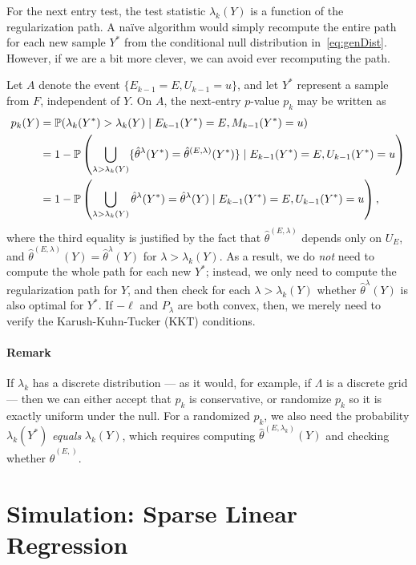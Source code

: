 \documentclass{article}
\begin{document}
For the next entry test, the test statistic $\lambda_k(Y)$ is a function of the regularization path. A na\"{i}ve algorithm would simply recompute the entire path for each new sample $Y^*$ from the conditional null distribution in~\eqref{eq:genDist}. However, if we are a bit more clever, we can avoid ever recomputing the path.

Let $A$ denote the event $\{E_{k-1}=E, U_{k-1}=u\}$, and let $Y^*$ represent a sample from $F$, independent of $Y$. On $A$, the next-entry $p$-value $p_k$ may be written as
\begin{align}
  p_k(Y) 
  &= \P(\lambda_k(Y^*) > \lambda_k(Y) \mid E_{k-1}(Y^*)=E, M_{k-1}(Y^*)=u)\\
  &= 1 - \P\left( \bigcup_{\lambda > \lambda_k(Y)} \{\hat\theta^\lambda(Y^*) = \hat\theta^{(E, \lambda)}(Y^*)\} \mid E_{k-1}(Y^*)=E, U_{k-1}(Y^*)=u\right) \\
  &= 1 - \P\left( \bigcup_{\lambda > \lambda_k(Y)} \hat\theta^\lambda(Y^*) = \hat\theta^{\lambda}(Y) \mid E_{k-1}(Y^*)=E, U_{k-1}(Y^*)=u\right),
\end{align}
where the third equality is justified by the fact that $\hat\theta^{(E, \lambda)}$ depends only on $U_E$, and $\hat\theta^{(E,\lambda)}(Y)=\hat\theta^\lambda(Y)$ for $\lambda > \lambda_k(Y)$. As a result, we do {\em not} need to compute the whole path for each new $Y^*$; instead, we only need to compute the regularization path for $Y$, and then check for each $\lambda > \lambda_k(Y)$ whether $\hat\theta^\lambda(Y)$ is also optimal for $Y^*$. If $-\ell$ and $P_\lambda$ are both convex, then, we merely need to verify the Karush-Kuhn-Tucker (KKT) conditions.

\paragraph{Remark} If $\lambda_k$ has a discrete distribution --- as it would, for example, if $\Lambda$ is a discrete grid --- then we can either accept that $p_k$ is conservative, or randomize $p_k$ so it is exactly uniform under the null. For a randomized $p_k$, we also need the probability $\lambda_k(Y^*)$ {\em equals} $\lambda_k(Y)$, which requires computing $\hat\theta^{(E, \lambda_k)}(Y)$ and checking whether $\hat\theta^{(E, )}$.


\section{Simulation: Sparse Linear Regression}
\label{sec:sparseReg}
\end{document}
